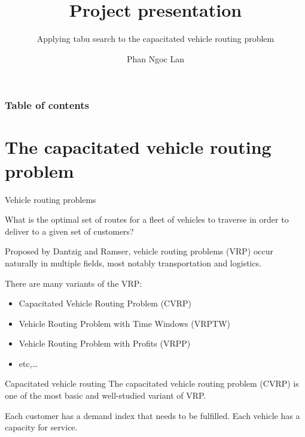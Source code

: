 \documentclass[9pt]{beamer}
\title{Project presentation}
\subtitle{Applying tabu search to the capacitated vehicle routing problem}
\author{Phan Ngoc Lan}
\institute{Hanoi University of Science and Technology}
\begin{document}

\titlepage

\begin{frame}
 \frametitle{Table of contents}
 \tableofcontents
\end{frame}

\section{The capacitated vehicle routing problem}
\begin{frame}{Vehicle routing problems}
\begin{block}{}
    What is the optimal set of routes for a fleet of vehicles to traverse in order to deliver to a given set of customers?
\end{block}

Proposed by Dantzig and Ramser, vehicle routing problems (VRP) occur naturally in multiple fields, most notably transportation and logistics.

There are many variants of the VRP:
\begin{itemize}
    \item Capacitated Vehicle Routing Problem (CVRP)
    \item Vehicle Routing Problem with Time Windows (VRPTW)
    \item Vehicle Routing Problem with Profits (VRPP)
    \item etc,\dots
\end{itemize}
\end{frame}

\begin{frame}{Capacitated vehicle routing}
The capacitated vehicle routing problem (CVRP) is one of the most basic and well-studied variant of VRP.

Each customer has a demand index that needs to be fulfilled. Each vehicle has a capacity for service.
\end{frame}
\end{document}
